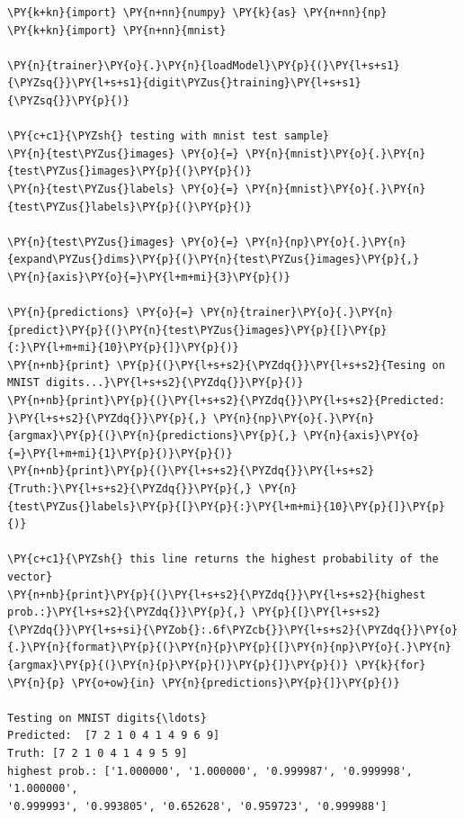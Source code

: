     \begin{tcolorbox}[breakable, size=fbox, boxrule=1pt, pad at break*=1mm,colback=cellbackground, colframe=cellborder]
\begin{Verbatim}[commandchars=\\\{\}]
\PY{k+kn}{import} \PY{n+nn}{numpy} \PY{k}{as} \PY{n+nn}{np}
\PY{k+kn}{import} \PY{n+nn}{mnist}

\PY{n}{trainer}\PY{o}{.}\PY{n}{loadModel}\PY{p}{(}\PY{l+s+s1}{\PYZsq{}}\PY{l+s+s1}{digit\PYZus{}training}\PY{l+s+s1}{\PYZsq{}}\PY{p}{)}

\PY{c+c1}{\PYZsh{} testing with mnist test sample}
\PY{n}{test\PYZus{}images} \PY{o}{=} \PY{n}{mnist}\PY{o}{.}\PY{n}{test\PYZus{}images}\PY{p}{(}\PY{p}{)}
\PY{n}{test\PYZus{}labels} \PY{o}{=} \PY{n}{mnist}\PY{o}{.}\PY{n}{test\PYZus{}labels}\PY{p}{(}\PY{p}{)}

\PY{n}{test\PYZus{}images} \PY{o}{=} \PY{n}{np}\PY{o}{.}\PY{n}{expand\PYZus{}dims}\PY{p}{(}\PY{n}{test\PYZus{}images}\PY{p}{,} \PY{n}{axis}\PY{o}{=}\PY{l+m+mi}{3}\PY{p}{)}

\PY{n}{predictions} \PY{o}{=} \PY{n}{trainer}\PY{o}{.}\PY{n}{predict}\PY{p}{(}\PY{n}{test\PYZus{}images}\PY{p}{[}\PY{p}{:}\PY{l+m+mi}{10}\PY{p}{]}\PY{p}{)}
\PY{n+nb}{print} \PY{p}{(}\PY{l+s+s2}{\PYZdq{}}\PY{l+s+s2}{Tesing on MNIST digits...}\PY{l+s+s2}{\PYZdq{}}\PY{p}{)}
\PY{n+nb}{print}\PY{p}{(}\PY{l+s+s2}{\PYZdq{}}\PY{l+s+s2}{Predicted: }\PY{l+s+s2}{\PYZdq{}}\PY{p}{,} \PY{n}{np}\PY{o}{.}\PY{n}{argmax}\PY{p}{(}\PY{n}{predictions}\PY{p}{,} \PY{n}{axis}\PY{o}{=}\PY{l+m+mi}{1}\PY{p}{)}\PY{p}{)} 
\PY{n+nb}{print}\PY{p}{(}\PY{l+s+s2}{\PYZdq{}}\PY{l+s+s2}{Truth:}\PY{l+s+s2}{\PYZdq{}}\PY{p}{,} \PY{n}{test\PYZus{}labels}\PY{p}{[}\PY{p}{:}\PY{l+m+mi}{10}\PY{p}{]}\PY{p}{)}

\PY{c+c1}{\PYZsh{} this line returns the highest probability of the vector}
\PY{n+nb}{print}\PY{p}{(}\PY{l+s+s2}{\PYZdq{}}\PY{l+s+s2}{highest prob.:}\PY{l+s+s2}{\PYZdq{}}\PY{p}{,} \PY{p}{[}\PY{l+s+s2}{\PYZdq{}}\PY{l+s+si}{\PYZob{}:.6f\PYZcb{}}\PY{l+s+s2}{\PYZdq{}}\PY{o}{.}\PY{n}{format}\PY{p}{(}\PY{n}{p}\PY{p}{[}\PY{n}{np}\PY{o}{.}\PY{n}{argmax}\PY{p}{(}\PY{n}{p}\PY{p}{)}\PY{p}{]}\PY{p}{)} \PY{k}{for} \PY{n}{p} \PY{o+ow}{in} \PY{n}{predictions}\PY{p}{]}\PY{p}{)}

Testing on MNIST digits{\ldots}
Predicted:  [7 2 1 0 4 1 4 9 6 9]
Truth: [7 2 1 0 4 1 4 9 5 9]
highest prob.: ['1.000000', '1.000000', '0.999987', '0.999998', '1.000000',
'0.999993', '0.993805', '0.652628', '0.959723', '0.999988']
    \end{Verbatim}
\end{tcolorbox}

